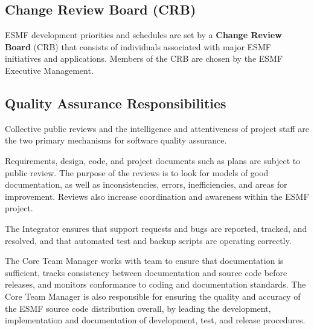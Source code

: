 \subsection{Change Review Board (CRB)}
\label{crb}
ESMF development priorities and schedules are set by a 
{\bf Change Review Board} (CRB) that consists of individuals
associated with major ESMF initiatives and applications.  
Members of the CRB are chosen by the ESMF Executive Management.

\subsection{Quality Assurance Responsibilities}

Collective public reviews and the intelligence and attentiveness of
project staff are the two primary mechanisms for software quality assurance.  

Requirements, design, code, and project documents such as plans
are subject to public review.  The purpose of the reviews is
to look for models of good documentation, as well as inconsistencies,
errors, inefficiencies, and areas for improvement.  Reviews also
increase coordination and awareness within the ESMF project.

The Integrator ensures that support requests
and bugs are reported, tracked, and resolved, and that automated
test and backup scripts are operating correctly.

The Core Team Manager works with team to ensure that documentation
is sufficient, tracks consistency between documentation and source
code before releases, and monitors conformance to coding and
documentation standards.  The Core Team Manager is also responsible
for ensuring the quality and accuracy of the ESMF source code
distribution overall, by leading the development,
implementation and documentation of development, test, and release
procedures.










